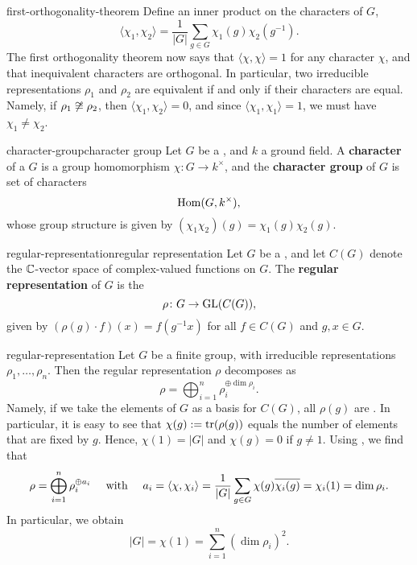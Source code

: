 \begin{example}{first-orthogonality-theorem}
    Define an inner product on the characters of $G$,
    \[ \langle \chi_1, \chi_2 \rangle = \frac{1}{|G|} \sum_{g \in G} \chi_1(g) \chi_2(g^{-1}) . \]
    The first orthogonality theorem now says that $\langle \chi, \chi \rangle = 1$ for any character $\chi$, and that inequivalent characters are orthogonal. In particular, two irreducible representations $\rho_1$ and $\rho_2$ are equivalent if and only if their characters are equal. Namely, if $\rho_1 \not\cong \rho_2$, then $\langle \chi_1, \chi_2 \rangle = 0$, and since $\langle \chi_1, \chi_1 \rangle = 1$, we must have $\chi_1 \ne \chi_2$.
\end{example}

\begin{topic}{character-group}{character group}
    Let $G$ be a , and $k$ a ground field. A \textbf{character} of a $G$ is a group homomorphism $\chi \colon G \to k^\times$, and the \textbf{character group} of $G$ is set of characters
    \[ \operatorname{Hom}(G, k^\times) , \]
    whose group structure is given by $(\chi_1 \chi_2)(g) = \chi_1(g) \chi_2(g)$.
\end{topic}

\begin{topic}{regular-representation}{regular representation}
    Let $G$ be a , and let $C(G)$ denote the $\mathbb{C}$-vector space of complex-valued functions on $G$. The \textbf{regular representation} of $G$ is the 
    \[ \rho \colon G \to \textup{GL}(C(G)) , \]
    given by $(\rho(g) \cdot f)(x) = f(g^{-1} x)$ for all $f \in C(G)$ and $g, x \in G$.
\end{topic}

\begin{example}{regular-representation}
    Let $G$ be a finite group, with irreducible representations $\rho_1, \ldots, \rho_n$. Then the regular representation $\rho$ decomposes as
    \[ \rho = \bigoplus_{i = 1}^{n} \rho_i^{\oplus \dim \rho_i} . \]
    Namely, if we take the elements of $G$ as a basis for $C(G)$, all $\rho(g)$ are . In particular, it is easy to see that $\chi(g) := \operatorname{tr}(\rho(g))$ equals the number of elements that are fixed by $g$. Hence, $\chi(1) = |G|$ and $\chi(g) = 0$ if $g \ne 1$. Using , we find that
    \[ \rho = \bigoplus_{i = 1}^{n} \rho_i^{\oplus a_i} \quad \textup{ with } \quad a_i = \langle \chi, \chi_i \rangle = \frac{1}{|G|} \sum_{g \in G} \chi(g) \overline{\chi_i(g)} = \chi_i(1) = \dim \rho_i . \]
    In particular, we obtain
    \[ |G| = \chi(1) = \sum_{i = 1}^{n} (\dim \rho_i)^2 . \]
\end{example}

